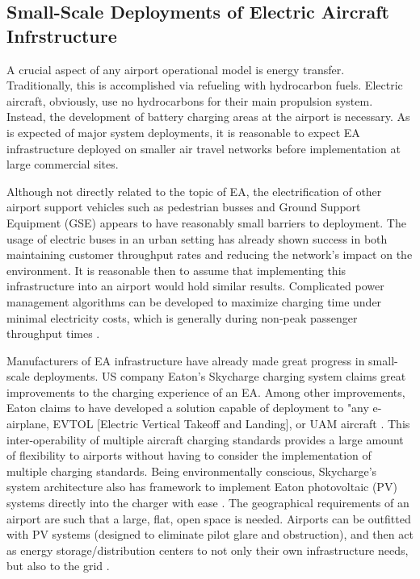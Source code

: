 \documentclass[../main.tex]{subfiles}
\begin{document}
\subsection{Small-Scale Deployments of Electric Aircraft Infrstructure}
A crucial aspect of any airport operational model is energy transfer. Traditionally, this is accomplished via refueling with hydrocarbon fuels. Electric aircraft, obviously, use no hydrocarbons for their main propulsion system. Instead, the development of battery charging areas at the airport is necessary. As is expected of major system deployments, it is reasonable to expect EA infrastructure deployed on smaller air travel networks before implementation at large commercial sites.\par
Although not directly related to the topic of EA, the electrification of other airport support vehicles such as pedestrian busses and Ground Support Equipment (GSE) appears to have reasonably small barriers to deployment. The usage of electric buses in an urban setting has already shown success in both maintaining customer throughput rates and reducing the network's impact on the environment.  It is reasonable then to assume that implementing this infrastructure into an airport would hold similar results. Complicated power management algorithms can be developed to maximize charging time under minimal electricity costs, which is generally during non-peak passenger throughput times \cite{ref26}.\par
Manufacturers of EA infrastructure have already made great progress in small-scale deployments. US company Eaton's Skycharge charging system claims great improvements to the charging experience of an EA. Among other improvements,  Eaton claims to have developed a solution capable of deployment to "any e-airplane, EVTOL [Electric Vertical Takeoff and Landing], or UAM aircraft \cite{ref3}. This inter-operability of multiple aircraft charging standards provides a large amount of flexibility to airports without having to consider the implementation of multiple charging standards. Being environmentally conscious, Skycharge's system architecture also has framework to implement Eaton photovoltaic (PV) systems directly into the charger with ease \cite{ref3}. The geographical requirements of an airport are such that a large, flat, open space is needed. Airports can be outfitted with PV systems (designed to eliminate pilot glare and obstruction), and then act as energy storage/distribution centers to not only their own infrastructure needs, but also to the grid \cite{ref26}.\par
\end{document}
